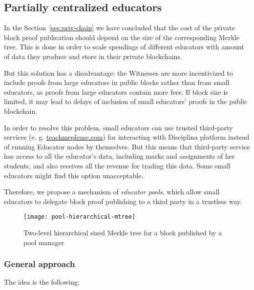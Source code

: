 \subsection{Partially centralized educators}
\label{apx:pools}

In the Section~\ref{sec:priv-chain} we have concluded that the cost of the
private block proof publication should depend on the size of the corresponding
Merkle tree. This is done in order to scale spendings of different educators
with amount of data they produce and store in their private blockchains.

But this solution has a disadvantage: the Witnesses are more incentivized to
include proofs from large educators in public blocks rather than from small
educators, as proofs from large educators contain more fees. If block size is
limited, it may lead to delays of inclusion of small educators' proofs in the
public blockchain.

In order to resolve this problem, small educators can use trusted third-party
services (e. g. \url{teachmeplease.com}) for interacting with Disciplina
platform instead of running Educator nodes by themselves. But this means that
third-party service has access to all the educator's data, including marks and
assignments of her students, and also receives all the revenue for trading this
data. Some small educators might find this option unacceptable.

Therefore, we propose a mechanism of \textit{educator pools}, which allow small
educators to delegate block proof publishing to a third party in a trustless
way.

\begin{figure}[ht]
  \centering
  \texttt{[image: pool-hierarchical-mtree]}
  \caption{Two-level hierarchical sized Merkle tree for a block published by a pool
    manager}
  \label{fig:pools:lvl2block}
\end{figure}

\subsubsection{General approach}

The idea is the following:

